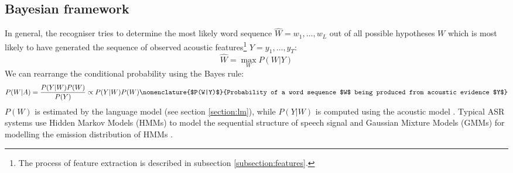 \subsection{Bayesian framework}
In general, the recogniser tries to determine the most likely word sequence $\hat{W}=w_{1}, \ldots, w_{L}$ out of all possible hypotheses $W$ which is most likely to have generated the sequence of observed acoustic features\footnote{The process of feature extraction is described in subsection \ref{subsection:features}.} $Y=y_{1}, \ldots, y_{T}$:
\begin{equation}
\label{equation:recogniser}
  \hat{W}=\max_{W}P(W|Y)
\end{equation}
We can rearrange the conditional probability using the Bayes rule:
\begin{equation}
  \label{equation:bayesian}
  P(W|A)=\frac{P(Y|W)P(W)}{P(Y)}\propto{P(Y|W)P(W)}
  \nomenclature{$P(W|Y)$}{Probability of a word sequence $W$ being produced from acoustic evidence $Y$}
\end{equation}
$P(W)$ is estimated by the language model (see section \ref{section:lm}), while $P(Y|W)$ is computed using the acoustic model \cite{whittaker2000statistical}. Typical ASR systems use Hidden Markov Models (HMMs)  to model the sequential structure of speech signal \cite{juang1985mixture, baker1975dragon} and Gaussian Mixture Models (GMMs)  for modelling the emission distribution of HMMs \cite{mohamed2012acoustic, bourlard1994connectionist}.

